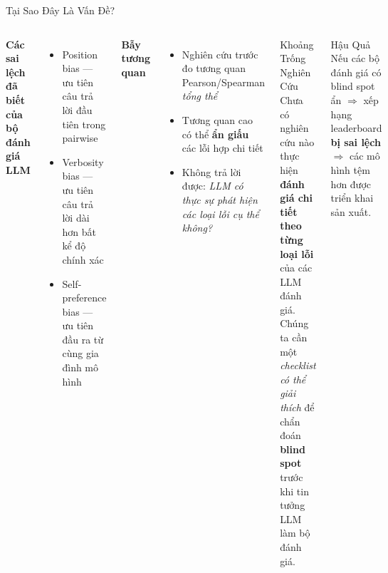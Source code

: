 \documentclass[aspectratio=169,10pt]{beamer}
\begin{document}
\begin{frame}{Tại Sao Đây Là Vấn Đề?}
  \begin{columns}[T]
      \textbf{Các sai lệch đã biết của bộ đánh giá LLM}
      \begin{itemize}
        \item \alert{Position bias} — ưu tiên câu trả lời đầu tiên trong pairwise
        \item \alert{Verbosity bias} — ưu tiên câu trả lời dài hơn bất kể độ chính xác
        \item \alert{Self-preference bias} — ưu tiên đầu ra từ cùng gia đình mô hình
      \end{itemize}

      \vspace{0.5em}
      \textbf{Bẫy tương quan}
      \begin{itemize}
        \item Nghiên cứu trước đo tương quan Pearson/Spearman \emph{tổng thể}
        \item Tương quan cao có thể \textbf{ẩn giấu} các lỗi hợp chi tiết
        \item Không trả lời được: \emph{LLM có thực sự phát hiện các loại lỗi cụ thể không?}
      \end{itemize}

      \begin{alertblock}{Khoảng Trống Nghiên Cứu}
        Chưa có nghiên cứu nào thực hiện \textbf{đánh giá chi tiết theo từng loại lỗi} của các LLM đánh giá.\\[0.4em]
        Chúng ta cần một \emph{checklist có thể giải thích} để chẩn đoán \textbf{blind spot} trước khi tin tưởng LLM làm bộ đánh giá.
      \end{alertblock}

      \vspace{0.4em}
      \begin{block}{Hậu Quả}
        Nếu các bộ đánh giá có blind spot ẩn $\Rightarrow$ xếp hạng leaderboard \textbf{bị sai lệch} $\Rightarrow$ các mô hình tệm hơn được triển khai sản xuất.
      \end{block}
  \end{columns}
\end{frame}
\end{document}
